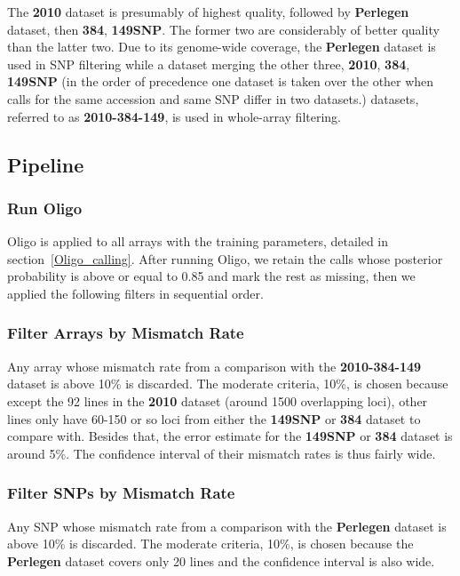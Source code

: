 \documentclass[a4paper,10pt]{article}
\begin{document}
The \textbf{2010} dataset is presumably of highest quality, followed by \textbf{Perlegen} dataset, then \textbf{384}, \textbf{149SNP}. The former two are considerably of better quality than the latter two. Due to its genome-wide coverage, the \textbf{Perlegen} dataset is used in SNP filtering while a dataset merging the other three, \textbf{2010}, \textbf{384}, \textbf{149SNP} (in the order of precedence one dataset is taken over the other when calls for the same accession and same SNP differ in two datasets.) datasets, referred to as \textbf{2010-384-149}, is used in whole-array filtering.


\subsection{Pipeline}

\subsubsection{Run Oligo}
Oligo is applied to all arrays with the training parameters, detailed in section~\ref{Oligo_calling}. After running Oligo, we retain the calls whose posterior probability is above or equal to 0.85 and mark the rest as missing, then we applied the following filters in sequential order.

\subsubsection{Filter Arrays by Mismatch Rate}
Any array whose mismatch rate from a comparison with the \textbf{2010-384-149} dataset is above 10\% is discarded. The moderate criteria, 10\%, is chosen because except the 92 lines in the \textbf{2010} dataset (around 1500 overlapping loci), other lines only have 60-150 or so loci from either the \textbf{149SNP} or \textbf{384} dataset to compare with. Besides that, the error estimate for the \textbf{149SNP} or \textbf{384} dataset is around 5\%. The confidence interval of their mismatch rates is thus fairly wide.

\subsubsection{Filter SNPs by Mismatch Rate}
Any SNP whose mismatch rate from a comparison with the \textbf{Perlegen} dataset is above 10\% is discarded. The moderate criteria, 10\%, is chosen because the \textbf{Perlegen} dataset covers only 20 lines and the confidence interval is also wide.
\end{document}
